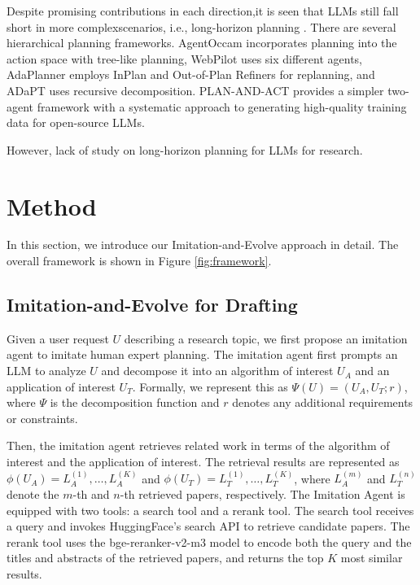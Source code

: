 \documentclass[manuscript,review,anonymous]{acmart}
\begin{document}
Despite promising contributions in each direction,it is seen that LLMs still fall short in more complexscenarios, i.e., long-horizon planning \cite{chen2024can}.  There are several hierarchical planning frameworks. AgentOccam \cite{yangagentoccam} incorporates planning into the action space with tree-like planning, WebPilot \cite{zhang2025webpilot} uses six
different agents, AdaPlanner \cite{sun2023adaplanner} employs InPlan and Out-of-Plan Refiners for replanning, and ADaPT \cite{prasad2024adapt} uses recursive decomposition. PLAN-AND-ACT \cite{erdogan2025plan} provides a simpler two-agent framework with a systematic approach to generating high-quality training data for open-source LLMs.

However, lack of study on long-horizon planning for LLMs for research.

\section{Method}

In this section, we introduce our Imitation-and-Evolve approach in detail. The overall framework is shown in Figure \ref{fig:framework}.

\subsection{Imitation-and-Evolve for Drafting}

Given a user request $U$ describing a research topic, we first propose an imitation agent to imitate human expert planning. The imitation agent first prompts an LLM to analyze $U$ and decompose it into an algorithm of interest $U_A$ and an application of interest $U_T$. Formally, we represent this as $\Psi(U) = (U_A, U_T; r)$, where $\Psi$ is the decomposition function and $r$ denotes any additional requirements or constraints.

Then, the imitation agent retrieves related work in terms of the algorithm of interest and the application of interest. The retrieval results are represented as $\phi(U_A) = {L_A^{(1)}, \ldots, L_A^{(K)}}$ and $\phi(U_T) = {L_T^{(1)}, \ldots, L_T^{(K)}}$, where $L_A^{(m)}$ and $L_T^{(n)}$ denote the $m$-th and $n$-th retrieved papers, respectively. The Imitation Agent is equipped with two tools: a search tool and a rerank tool. The search tool receives a query and invokes HuggingFace's search API to retrieve candidate papers. The rerank tool uses the bge-reranker-v2-m3 model to encode both the query and the titles and abstracts of the retrieved papers, and returns the top $K$ most similar results.
\end{document}
